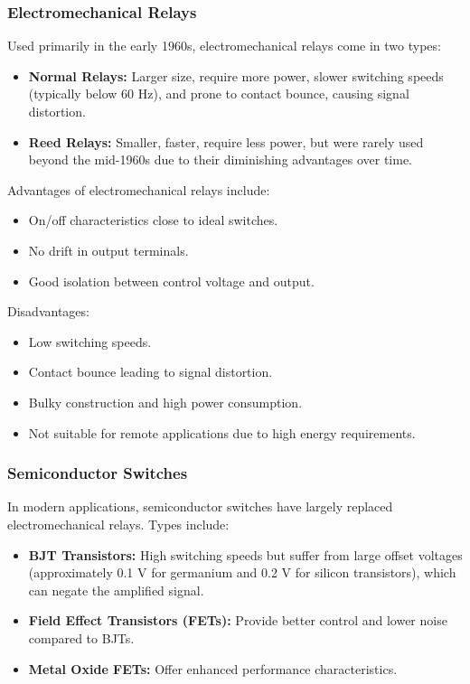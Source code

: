 \documentclass[a4paper,9pt,twoside,openany,twocolumn]{memoir}
\begin{document}
\subsubsection{Electromechanical Relays}
Used primarily in the early 1960s, electromechanical relays come in two types:
\begin{itemize}
    \item \textbf{Normal Relays:} Larger size, require more power, slower switching speeds (typically below 60 Hz), and prone to contact bounce, causing signal distortion.
    \item \textbf{Reed Relays:} Smaller, faster, require less power, but were rarely used beyond the mid-1960s due to their diminishing advantages over time.
\end{itemize}
Advantages of electromechanical relays include:
\begin{itemize}
    \item On/off characteristics close to ideal switches.
    \item No drift in output terminals.
    \item Good isolation between control voltage and output.
\end{itemize}
Disadvantages:
\begin{itemize}
    \item Low switching speeds.
    \item Contact bounce leading to signal distortion.
    \item Bulky construction and high power consumption.
    \item Not suitable for remote applications due to high energy requirements.
\end{itemize}

\subsubsection{Semiconductor Switches}
In modern applications, semiconductor switches have largely replaced electromechanical relays. Types include:
\begin{itemize}
    \item \textbf{BJT Transistors:} High switching speeds but suffer from large offset voltages (approximately 0.1 V for germanium and 0.2 V for silicon transistors), which can negate the amplified signal.
    \item \textbf{Field Effect Transistors (FETs):} Provide better control and lower noise compared to BJTs.
    \item \textbf{Metal Oxide FETs:} Offer enhanced performance characteristics.
\end{itemize}
\end{document}
